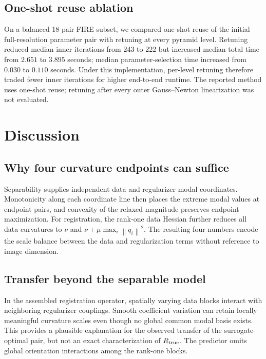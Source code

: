 \documentclass[11pt]{article}
\theoremstyle{definition}
\newcommand{\norm}[1]{\left\lVert #1\right\rVert}
\begin{document}
\subsection{One-shot reuse ablation}
On a balanced 18-pair FIRE subset, we compared one-shot reuse of the initial
full-resolution parameter pair with retuning at every pyramid level. Retuning
reduced median inner iterations from 243 to 222 but increased median total time
from $2.651$ to $3.895$ seconds; median parameter-selection time increased from
$0.030$ to $0.110$ seconds. Under this implementation, per-level retuning
therefore traded fewer inner iterations for higher end-to-end runtime. The
reported method uses one-shot reuse; retuning after every outer
Gauss--Newton linearization was not evaluated.

\section{Discussion}\label{sec:discussion}
\subsection{Why four curvature endpoints can suffice}
Separability supplies independent data and regularizer modal coordinates.
Monotonicity along each coordinate line then places the extreme modal values
at endpoint pairs, and convexity of the relaxed magnitude preserves endpoint
maximization.
For registration, the rank-one data Hessian further reduces all data
curvatures to $\nu$ and
$\nu+\mu\max_i\norm{q_i}^2$. The resulting four numbers encode the scale
balance between the data and regularization terms without reference to image
dimension.

\subsection{Transfer beyond the separable model}
In the assembled registration operator, spatially varying data blocks interact
with neighboring regularizer couplings. Smooth coefficient variation can
retain locally meaningful curvature scales even though no global common modal
basis exists. This provides a plausible explanation for the observed transfer
of the surrogate-optimal pair, but not an exact characterization of
$R_{\rm true}$. The predictor omits global orientation interactions among the
rank-one blocks.
\end{document}
